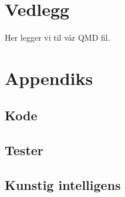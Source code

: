 \documentclass[
  12pt,
  a4paper,
  DIV=11,
  numbers=noendperiod]{scrartcl}
\begin{document}
\newpage

\section*{Vedlegg}\label{vedlegg}

Her legger vi til vår QMD fil.

\section*{Appendiks}\label{appendiks}

\subsection*{Kode}\label{kode}

\subsection*{Tester}\label{tester}

\subsection*{Kunstig intelligens}\label{kunstig-intelligens}
\end{document}
